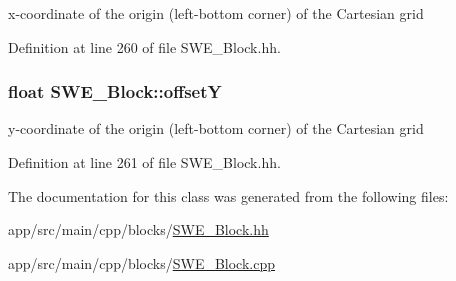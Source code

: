 x-\/coordinate of the origin (left-\/bottom corner) of the Cartesian grid 



Definition at line 260 of file S\+W\+E\+\_\+\+Block.\+hh.

\subsubsection[{\texorpdfstring{offsetY}{offsetY}}]{\setlength{\rightskip}{0pt plus 5cm}float S\+W\+E\+\_\+\+Block\+::offsetY\hspace{0.3cm}{\ttfamily [protected]}}\hypertarget{classSWE__Block_aa05241101a66f0f0548eba6dbbaa1bbb}{}\label{classSWE__Block_aa05241101a66f0f0548eba6dbbaa1bbb}


y-\/coordinate of the origin (left-\/bottom corner) of the Cartesian grid 



Definition at line 261 of file S\+W\+E\+\_\+\+Block.\+hh.



The documentation for this class was generated from the following files\+:\begin{DoxyCompactItemize}
\item 
app/src/main/cpp/blocks/\hyperlink{SWE__Block_8hh}{S\+W\+E\+\_\+\+Block.\+hh}\item 
app/src/main/cpp/blocks/\hyperlink{SWE__Block_8cpp}{S\+W\+E\+\_\+\+Block.\+cpp}\end{DoxyCompactItemize}
